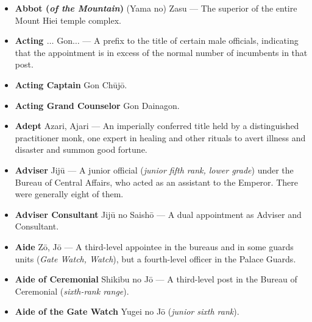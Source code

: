 \documentclass{article}
\begin{document}
\setlength{\columnsep}{4.5em}
\begin{multicols}{2}

	\begin{small}%
		\begin{itemize}[
				label=,
				leftmargin=0em,
				rightmargin=-1.5em,
				itemindent=-2em,
			]
			\setlength{\itemsep}{0.075em}

			\item \textbf{Abbot (\textit{of the Mountain})} (Yama no) Zasu --- The superior of the entire Mount Hiei temple complex.

			\item \textbf{Acting \(\ldots\)} Gon\(\ldots\)  --- A prefix to the title of certain male officials, indicating that the appointment is in excess of the normal number of incumbents in that post.

			\item \textbf{Acting Captain} Gon Chūjō.

			\item \textbf{Acting Grand Counselor} Gon Dainagon.

			\item \textbf{Adept} Azari, Ajari --- An imperially conferred title held by a distinguished practitioner monk, one expert in healing and other rituals to avert illness and disaster and summon good fortune.

			\item \textbf{Adviser} Jijū --- A junior official (\textit{junior fifth rank, lower grade}) under the Bureau of Central Affairs, who acted as an assistant to the Emperor. There were generally eight of them.

			\item \textbf{Adviser Consultant} Jijū no Saishō --- A dual appointment as Adviser and Consultant.

			\item \textbf{Aide} Zō, Jō --- A third-level appointee in the bureaus and in some guards units (\textit{Gate Watch, Watch}), but a fourth-level officer in the Palace Guards.

			\item \textbf{Aide of Ceremonial} Shikibu no Jō --- A third-level post in the Bureau of Ceremonial (\textit{sixth-rank range}).

			\item \textbf{Aide of the Gate Watch} Yugei no Jō (\textit{junior sixth rank}).


\end{itemize}
\end{small}
\end{multicols}
\end{document}
